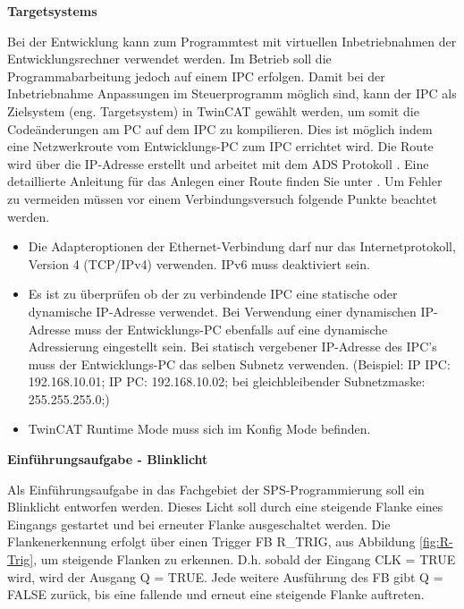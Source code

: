 

\textbf{Targetsystems}

Bei der Entwicklung kann zum Programmtest mit virtuellen Inbetriebnahmen der Entwicklungsrechner verwendet werden. Im Betrieb  soll die Programmabarbeitung jedoch auf einem IPC erfolgen. Damit bei der Inbetriebnahme Anpassungen im Steuerprogramm möglich sind, kann der IPC als Zielsystem  (eng. Targetsystem) in TwinCAT  gewählt werden, um somit die Codeänderungen am PC auf dem IPC zu kompilieren. Dies ist möglich indem eine Netzwerkroute vom Entwicklungs-PC zum IPC errichtet wird. Die Route wird über die IP-Adresse erstellt und arbeitet mit dem ADS Protokoll \cite{InfosysADS}. Eine detaillierte Anleitung für das Anlegen einer Route finden Sie unter \cite{InfosysZielsystem}. Um Fehler zu vermeiden müssen vor einem Verbindungsversuch folgende Punkte beachtet werden.

\begin{itemize}
	\item[1.] Die Adapteroptionen der Ethernet-Verbindung darf nur das Internetprotokoll, Version 4 (TCP/IPv4) verwenden. IPv6 muss deaktiviert sein.
	\item[2.] Es ist zu überprüfen ob der zu verbindende IPC eine statische oder dynamische IP-Adresse verwendet. Bei Verwendung einer dynamischen IP-Adresse muss der Entwicklungs-PC ebenfalls auf eine dynamische Adressierung eingestellt sein. Bei statisch vergebener IP-Adresse des IPC's muss der Entwicklungs-PC das selben Subnetz verwenden.  (Beispiel: IP IPC: 192.168.10.01; IP PC: 192.168.10.02; bei gleichbleibender Subnetzmaske: 255.255.255.0;)
	\item[3.] TwinCAT Runtime Mode muss sich im \textrm{Konfig Mode} befinden.
\end{itemize}

\textbf{Einführungsaufgabe - Blinklicht}

Als Einführungsaufgabe in das Fachgebiet der SPS-Programmierung soll ein Blinklicht entworfen werden. Dieses Licht soll durch eine steigende Flanke eines Eingangs gestartet und bei erneuter Flanke ausgeschaltet werden. Die Flankenerkennung erfolgt über einen Trigger FB \textrm{R\_TRIG}, aus Abbildung \ref{fig:R-Trig}, um steigende Flanken zu erkennen. D.h. sobald der Eingang \textrm{CLK = TRUE}  wird, wird der Ausgang \textrm{Q = TRUE}. Jede weitere Ausführung des FB gibt \textrm{Q = FALSE} zurück, bis eine fallende und erneut eine steigende Flanke auftreten.   

